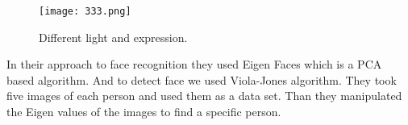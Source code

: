 \documentclass[10pt,twocolumn,letterpaper]{article}
\begin{document}
\begin{figure}[htbp]
\begin{center}
\texttt{[image: 333.png]}
\end{center}
\caption{ Different light and expression.}
\label{fig:2}
\end{figure}
In their approach to face recognition they used Eigen Faces which is a PCA based algorithm. And to detect face we used
Viola-Jones algorithm. They took five images of each person and used them as a data set. Than they manipulated the Eigen values of the images to find a specific person.


{\small


}
\end{document}

